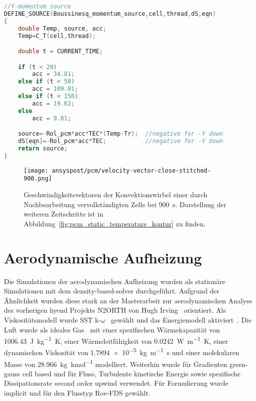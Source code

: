 \begin{lstlisting}[language=C, float, caption={Boussinesq-Approximation des Auftriebs im \ac{pcm} in der \ac{udf} eicosane.c}, label={lst:udf_bossinesque}]
//Y-momentum source
DEFINE_SOURCE(Boussinesq_momentum_source,cell,thread,dS,eqn)
{
	double Temp, source, acc;
	Temp=C_T(cell,thread);

	double t = CURRENT_TIME;

	if (t < 20)
		acc = 34.81;
	else if (t < 50)
		acc = 109.81;
	else if (t < 150)
		acc = 19.62;
	else
		acc = 9.81;

	source=-Rol_pcm*acc*TEC*(Temp-Tr);  //negative for -Y down
	dS[eqn]=-Rol_pcm*acc*TEC; 			//negative for -Y down
	return source;
}
\end{lstlisting}

\begin{figure}
  \centering
  \texttt{[image: ansyspost/pcm/velocity-vector-close-stitched-900.png]}
  \caption{Geschwindigkeitsvektoren der Konvektionswirbel einer durch Nachbearbeitung vervollständigten Zelle
  bei \SI{900}{\second}. Darstellung der weiteren Zeitschritte ist in Abbildung~\ref{fig:pcm_static_temperature_kontur} zu finden.}\label{fig:pcm_vectoren_stitched}
\end{figure}

\section{Aerodynamische Aufheizung}\label{sec:sim_aerodynamisch}

Die Simulationen der aerodynamischen Aufheizung wurden als stationäre Simulationen mit dem density-based-solver durchgeführt.
Aufgrund der Ähnlichkeit wurden diese stark an der Masterarbeit zur aerodynamischen Analyse des vorherigen
\ac{hyend} Projekts N2ORTH von Hugh Irving~\cite{Irving-2021} orientiert.
Als Viskositätsmodell wurde SST k-$\omega$~\cite{Irving-2021} gewählt und das Energiemodell aktiviert~\cite{Irving-2021}.
Die Luft wurde als ideales Gas~\cite{Irving-2021} mit einer spezifischen Wärmekapazität von \SI{1006.43}{\joule\per\kilogram\kelvin},
einer Wärmeleitfähigkeit von \SI{0.0242}{\watt\per\meter\kelvin}, einer dynamischen Viskosität von \SI{1.7894e-5}{\kilogram\per\meter\second}
und einer molekularen Masse von \SI{28,966}{\kilogram\per\kilo\mole} modelliert.
Weiterhin wurde für Gradienten green-gauss cell based und für Fluss, Turbulente kinetische Energie sowie spezifische Dissipationsrate second order upwind verwendet.
Für Formulierung wurde implicit und für den Flusstyp Roe-FDS gewählt.

